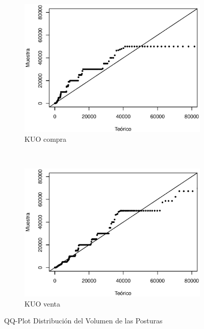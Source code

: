 \documentclass[11pt]{article}
\numberwithin{equation}{section} %
\begin{document}
\begin{figure}[htbp]
\begin{subfigure}[b]{0.5\textwidth}
\centering
\includegraphics[width=\textwidth, trim=0 0.5cm 0 1cm]{kuovolumencompraqq.eps}
\caption{KUO compra}
\label{fig:kuovolumencompraqq}
\end{subfigure}%
~ %
\begin{subfigure}[b]{0.5\textwidth}
\centering
\includegraphics[width=\textwidth, trim=0 0.5cm 0 1cm]{kuovolumenventaqq.eps}
\caption{KUO venta}
\label{fig:kuovolumenventaqq}
\end{subfigure}

\caption{QQ-Plot Distribución del Volumen de las Posturas}
\label{fig:volumenqq}
\end{figure}
\end{document}
